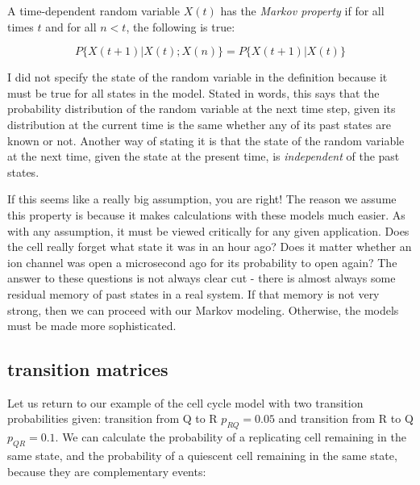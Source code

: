 \documentclass[
  letterpaper,
  DIV=11,
  numbers=noendperiod]{scrreprt}
\begin{document}
\begin{tcolorbox}[enhanced jigsaw, coltitle=black, arc=.35mm, opacitybacktitle=0.6, breakable, bottomtitle=1mm, toptitle=1mm, titlerule=0mm, colback=white, leftrule=.75mm, rightrule=.15mm, colframe=quarto-callout-note-color-frame, colbacktitle=quarto-callout-note-color!10!white, opacityback=0, title=\textcolor{quarto-callout-note-color}{\faInfo}\hspace{0.5em}{Definition}, left=2mm, toprule=.15mm, bottomrule=.15mm]

A time-dependent random variable \(X(t)\) has the \emph{Markov property}
if for all times \(t\) and for all \(n<t\), the following is true:

\[P\{ X(t+1)| X(t) ; X(n) \} = P\{ X(t+1)| X(t) \}\]

\end{tcolorbox}

I did not specify the state of the random variable in the definition
because it must be true for all states in the model. Stated in words,
this says that the probability distribution of the random variable at
the next time step, given its distribution at the current time is the
same whether any of its past states are known or not. Another way of
stating it is that the state of the random variable at the next time,
given the state at the present time, is \emph{independent} of the past
states.

If this seems like a really big assumption, you are right! The reason we
assume this property is because it makes calculations with these models
much easier. As with any assumption, it must be viewed critically for
any given application. Does the cell really forget what state it was in
an hour ago? Does it matter whether an ion channel was open a
microsecond ago for its probability to open again? The answer to these
questions is not always clear cut - there is almost always some residual
memory of past states in a real system. If that memory is not very
strong, then we can proceed with our Markov modeling. Otherwise, the
models must be made more sophisticated.

\hypertarget{transition-matrices}{%
\subsection{transition matrices}\label{transition-matrices}}

Let us return to our example of the cell cycle model with two transition
probabilities given: transition from Q to R \(p_{RQ} = 0.05\) and
transition from R to Q \(p_{QR} = 0.1\). We can calculate the
probability of a replicating cell remaining in the same state, and the
probability of a quiescent cell remaining in the same state, because
they are complementary events:
\end{document}
